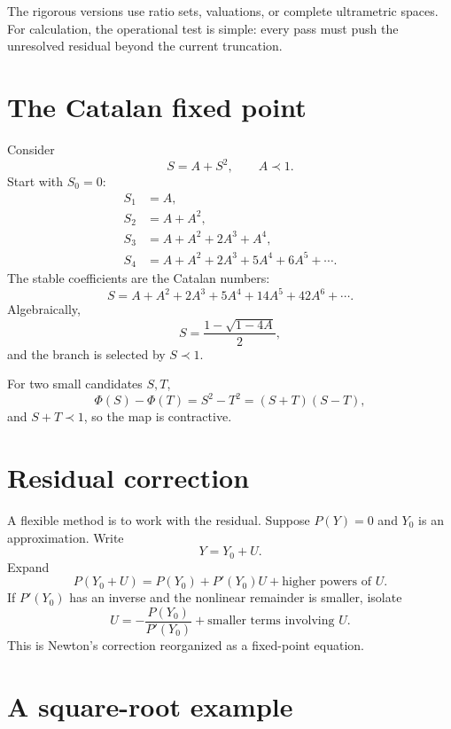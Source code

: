 \documentclass[11pt,openany]{book}
\theoremstyle{definition}
\theoremstyle{plain}
\theoremstyle{remark}
\newcommand{\precdom}{\prec}
\begin{document}
The rigorous versions use ratio sets, valuations, or complete ultrametric spaces. For calculation, the operational test is simple: every pass must push the unresolved residual beyond the current truncation.

\section{The Catalan fixed point}

Consider
\begin{equation}\label{eq:Catalan-fixed}
 S=A+S^2,
 \qquad A\precdom1.
\end{equation}
Start with $S_0=0$:
\begin{align*}
 S_1&=A,\\
 S_2&=A+A^2,\\
 S_3&=A+A^2+2A^3+A^4,\\
 S_4&=A+A^2+2A^3+5A^4+6A^5+\cdots.
\end{align*}
The stable coefficients are the Catalan numbers:
\begin{equation}\label{eq:Catalan-series}
 S=A+A^2+2A^3+5A^4+14A^5+42A^6+\cdots.
\end{equation}
Algebraically,
\[
 S=\frac{1-\sqrt{1-4A}}2,
\]
and the branch is selected by $S\precdom1$.

For two small candidates $S,T$,
\[
 \Phi(S)-\Phi(T)=S^2-T^2=(S+T)(S-T),
\]
and $S+T\precdom1$, so the map is contractive.

\section{Residual correction}

A flexible method is to work with the residual. Suppose $P(Y)=0$ and $Y_0$ is an approximation. Write
\[
 Y=Y_0+U.
\]
Expand
\[
 P(Y_0+U)=P(Y_0)+P'(Y_0)U+\text{higher powers of }U.
\]
If $P'(Y_0)$ has an inverse and the nonlinear remainder is smaller, isolate
\begin{equation}\label{eq:residual-fixed}
 U=-\frac{P(Y_0)}{P'(Y_0)}+\text{smaller terms involving }U.
\end{equation}
This is Newton's correction reorganized as a fixed-point equation.

\section{A square-root example}
\end{document}
